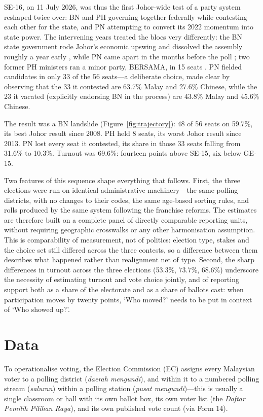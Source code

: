 \documentclass[11pt]{article}
\begin{document}
SE-16, on 11 July 2026, was thus the first Johor-wide test of a party system reshaped twice over: BN and PH governing together federally while contesting each other for the state, and PN attempting to convert its 2022 momentum into state power. The intervening years treated the blocs very differently: the BN state government rode Johor's economic upswing and dissolved the assembly roughly a year early \cite{hutchinson2026}, while PN came apart in the months before the poll \cite{fulcrum2026}; two former PH ministers ran a minor party, BERSAMA, in 15 seats \cite{fmt2026}. PN fielded candidates in only 33 of the 56 seats---a deliberate choice, made clear by observing that the 33 it contested are 63.7\% Malay and 27.6\% Chinese, while the 23 it vacated (explicitly endorsing BN in the process) are 43.8\% Malay and 45.6\% Chinese.

The result was a BN landslide (Figure~\ref{fig:trajectory}): 48 of 56 seats on 59.7\%, its best Johor result since 2008. PH held 8 seats, its worst Johor result since 2013. PN lost every seat it contested, its share in those 33 seats falling from 31.6\% to 10.3\%. Turnout was 69.6\%: fourteen points above SE-15, six below GE-15.

Two features of this sequence shape everything that follows. First, the three elections were run on identical administrative machinery---the same polling districts, with no changes to their codes, the same age-based sorting rules, and rolls produced by the same system following the franchise reforms. The estimates are therefore built on a complete panel of directly comparable reporting units, without requiring geographic crosswalks or any other harmonisation assumption. This is comparability of measurement, not of politics: election type, stakes and the choice set still differed across the three contests, so a difference between them describes what happened rather than realignment net of type. Second, the sharp differences in turnout across the three elections (53.3\%, 73.7\%, 68.6\%) underscore the necessity of estimating turnout and vote choice jointly, and of reporting support both as a share of the electorate and as a share of ballots cast: when participation moves by twenty points, `Who moved?' needs to be put in context of `Who showed up?'.

\section{Data}
\label{sec:data}

To operationalise voting, the Election Commission (EC) assigns every Malaysian voter to a polling district (\emph{daerah mengundi}), and within it to a numbered polling stream (\emph{saluran}) within a polling station (\emph{pusat mengundi})---this is usually a single classroom or hall with its own ballot box, its own voter list (the \emph{Daftar Pemilih Pilihan Raya}), and its own published vote count (via Form 14).
\end{document}
